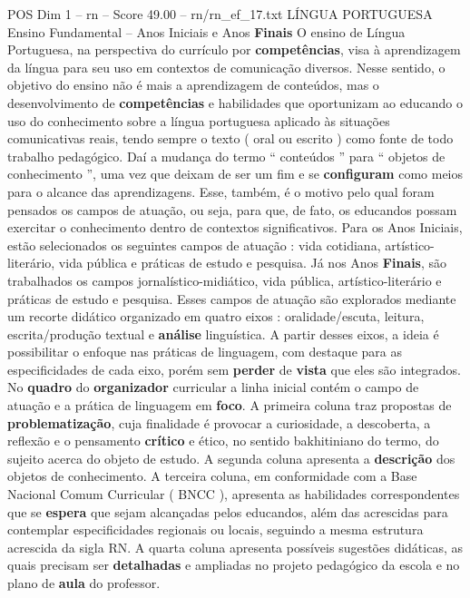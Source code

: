 \begin{textsample}{POS Dim 1 – rn – Score 49.00 – rn/rn\_ef\_17.txt}  \label{ex:f1_pos_263}
LÍNGUA PORTUGUESA Ensino Fundamental – Anos Iniciais e Anos \textbf{Finais} O ensino de Língua Portuguesa, na perspectiva do currículo por \textbf{competências}, visa à aprendizagem da língua para seu uso em contextos de comunicação diversos.
Nesse sentido, o objetivo do ensino não é mais a aprendizagem de conteúdos, mas o desenvolvimento de \textbf{competências} e habilidades que oportunizam ao educando o uso do conhecimento sobre a língua portuguesa aplicado às situações comunicativas reais, tendo sempre o texto ( oral ou escrito ) como fonte de todo trabalho pedagógico.
Daí a mudança do termo “ conteúdos ” para “ objetos de conhecimento ”, uma vez que deixam de ser um fim e se \textbf{configuram} como meios para o alcance das aprendizagens.
Esse, também, é o motivo pelo qual foram pensados os campos de atuação, ou seja, para que, de fato, os educandos possam exercitar o conhecimento dentro de contextos significativos.
Para os Anos Iniciais, estão selecionados os seguintes campos de atuação : vida cotidiana, artístico-literário, vida pública e práticas de estudo e pesquisa.
Já nos Anos \textbf{Finais}, são trabalhados os campos jornalístico-midiático, vida pública, artístico-literário e práticas de estudo e pesquisa.
Esses campos de atuação são explorados mediante um recorte didático organizado em quatro eixos : oralidade/escuta, leitura, escrita/produção textual e \textbf{análise} linguística.
A partir desses eixos, a ideia é possibilitar o enfoque nas práticas de linguagem, com destaque para as especificidades de cada eixo, porém sem \textbf{perder} de \textbf{vista} que eles são integrados.
No \textbf{quadro} do \textbf{organizador} curricular a linha inicial contém o campo de atuação e a prática de linguagem em \textbf{foco}.
A primeira coluna traz propostas de \textbf{problematização}, cuja finalidade é provocar a curiosidade, a descoberta, a reflexão e o pensamento \textbf{crítico} e ético, no sentido bakhitiniano do termo, do sujeito acerca do objeto de estudo.
A segunda coluna apresenta a \textbf{descrição} dos objetos de conhecimento.
A terceira coluna, em conformidade com a Base Nacional Comum Curricular ( BNCC ), apresenta as habilidades correspondentes que se \textbf{espera} que sejam alcançadas pelos educandos, além das acrescidas para contemplar especificidades regionais ou locais, seguindo a mesma estrutura acrescida da sigla RN.
A quarta coluna apresenta possíveis sugestões didáticas, as quais precisam ser \textbf{detalhadas} e ampliadas no projeto pedagógico da escola e no plano de \textbf{aula} do professor.

\end{textsample}
